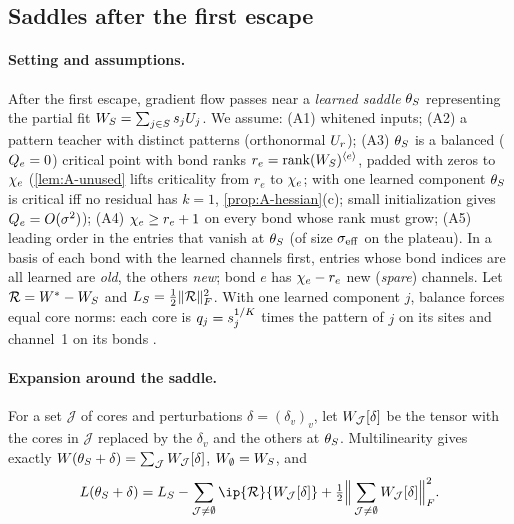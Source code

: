 \subsection{Saddles after the first escape}\label{app:saddles}

\paragraph{Setting and assumptions.}
After the first escape, gradient flow passes near a \emph{learned saddle} $\theta_S$ representing the
partial fit $W_S=\sum_{j\in S}s_{j}U_{j}$. We assume: (A1) whitened inputs; (A2) a
pattern teacher with distinct patterns (orthonormal $U_{r}$); (A3) $\theta_S$ is a balanced ($Q_{e}=0$)
critical point with bond ranks $r_e=\operatorname{rank}(W_S)^{\langle e\rangle}$, padded with zeros to $\chi_{e}$ (\cref{lem:A-unused}
lifts criticality from $r_e$ to $\chi_{e}$; with one learned component $\theta_S$ is critical iff no residual
has $k=1$, \cref{prop:A-hessian}(c); small initialization gives $Q_{e}=O(\sigma^2)$); (A4) $\chi_{e}\ge r_e+1$ on
every bond whose rank must grow; (A5) leading order in the entries that vanish at $\theta_S$ (of size
$\sigma_{\rm eff}$ on the plateau). In a basis of each bond with the learned channels first, entries whose bond
indices are all learned are \emph{old}, the others \emph{new}; bond $e$ has $\chi_{e}-r_e$ new
(\emph{spare}) channels. Let $\mathcal R=W^{*}-W_S$ and
$L_S=\frac12\lVert\mathcal R\rVert_{F}^2$. With one learned component $j$, balance forces equal core norms: each core is
$q_j=s_{j}^{1/K}$ times the pattern of $j$ on its sites and channel~1 on its bonds \proven.

\paragraph{Expansion around the saddle.}
For a set $\mathcal J$ of cores and perturbations $\delta=(\delta_v)_v$, let $W_{\mathcal J}[\delta]$ be the
tensor with the cores in $\mathcal J$ replaced by the $\delta_v$ and the others at $\theta_S$. Multilinearity
gives exactly $W(\theta_S+\delta)=\sum_{\mathcal J}W_{\mathcal J}[\delta]$, $W_\emptyset=W_S$, and
\begin{equation}\label{eq:A-expansion}
  \Loss(\params_S+\delta)=\Loss_S-\sum_{\mathcal J\neq\emptyset}\ip{\mathcal R}{\W_{\mathcal J}[\delta]}
  +\tfrac12\Big\|\sum_{\mathcal J\neq\emptyset}\W_{\mathcal J}[\delta]\Big\|_F^2 .
\end{equation}

